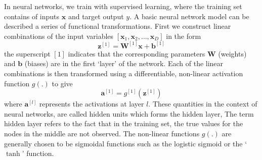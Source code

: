\documentclass[12pt]{report}
\numberwithin{equation}{section}
\begin{document}
In neural networks, we train with supervised learning, where the training set contains of inputs $\bm{x}$ and target output $y$. A basic neural network model  can be described a series of functional transformations. First we construct linear combinations of the input variables $[\bm{x}_1,\bm{x}_2,\hdots,\bm{x}_D]$ in the form
\begin{equation}\label{z1}
\bm{z}^{[1]} = \bm{W}^{[1]}\bm{x} + \bm{b}^{[1]}
\end{equation}
the superscript $[1]$ indicates that the corresponding parameters $\bm{W}$ (weights) and $\bm{b}$ (biases) are in the first `layer' of the network. Each of the linear combinations is then transformed using a differentiable, non-linear activation function $g(.)$ to give
\begin{equation}\label{a1}
\bm{a}^{[1]} = g^{[1]}(\bm{z}^{[1]})
\end{equation}
where $\bm{a}^{[l]}$ represents the activations at layer $l$. These quantities in the context of neural networks, are called {hidden units} which forms the hidden layer, The term hidden layer refers to the fact that in the training set, the true values for the nodes in the middle are not observed. The non-linear functions $g(.)$ are generally chosen to be sigmoidal functions such as the logistic sigmoid or the `$\tanh$' function. 
\end{document}
